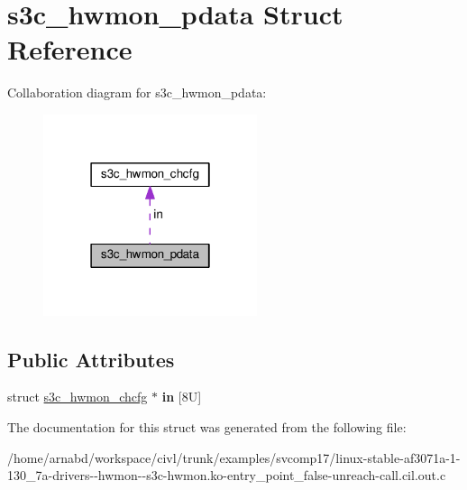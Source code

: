 \hypertarget{structs3c__hwmon__pdata}{}\section{s3c\+\_\+hwmon\+\_\+pdata Struct Reference}
\label{structs3c__hwmon__pdata}


Collaboration diagram for s3c\+\_\+hwmon\+\_\+pdata\+:
\nopagebreak
\begin{figure}[H]
\begin{center}
\leavevmode
\includegraphics[width=178pt]{structs3c__hwmon__pdata__coll__graph}
\end{center}
\end{figure}
\subsection*{Public Attributes}
\begin{DoxyCompactItemize}
\item 
\hypertarget{structs3c__hwmon__pdata_a3faabe47c836b5971e744a2e475d0b58}{}struct \hyperlink{structs3c__hwmon__chcfg}{s3c\+\_\+hwmon\+\_\+chcfg} $\ast$ {\bfseries in} \mbox{[}8\+U\mbox{]}\label{structs3c__hwmon__pdata_a3faabe47c836b5971e744a2e475d0b58}

\end{DoxyCompactItemize}


The documentation for this struct was generated from the following file\+:\begin{DoxyCompactItemize}
\item 
/home/arnabd/workspace/civl/trunk/examples/svcomp17/linux-\/stable-\/af3071a-\/1-\/130\+\_\+7a-\/drivers-\/-\/hwmon-\/-\/s3c-\/hwmon.\+ko-\/entry\+\_\+point\+\_\+false-\/unreach-\/call.\+cil.\+out.\+c\end{DoxyCompactItemize}
